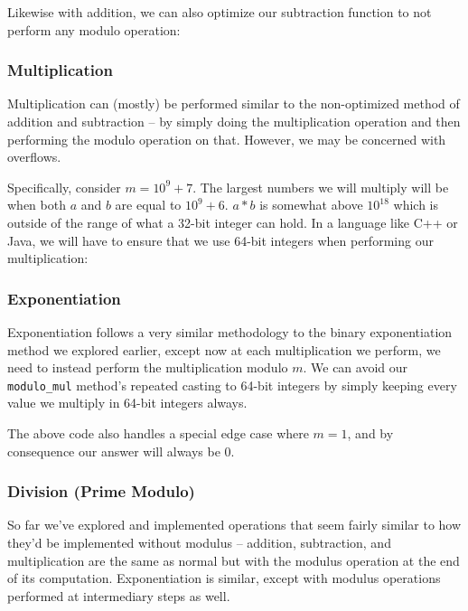 
Likewise with addition, we can also optimize our subtraction function to not perform any modulo operation:


\subsubsection{Multiplication}

Multiplication can (mostly) be performed similar to the non-optimized method of addition and subtraction -- by simply doing the multiplication operation and then performing the modulo operation on that. However, we may be concerned with overflows.

Specifically, consider $m = 10^9 + 7$. The largest numbers we will multiply will be when both $a$ and $b$ are equal to $10^9 + 6$. $a * b$ is somewhat above $10^{18}$ which is outside of the range of what a 32-bit integer can hold. In a language like C++ or Java, we will have to ensure that we use 64-bit integers when performing our multiplication:


\subsubsection{Exponentiation}

Exponentiation follows a very similar methodology to the binary exponentiation method we explored earlier, except now at each multiplication we perform, we need to instead perform the multiplication modulo $m$. We can avoid our \texttt{modulo_mul} method's repeated casting to 64-bit integers by simply keeping every value we multiply in 64-bit integers always.


The above code also handles a special edge case where $m = 1$, and by consequence our answer will always be $0$.

\subsubsection{Division (Prime Modulo)}

So far we've explored and implemented operations that seem fairly similar to how they'd be implemented without modulus -- addition, subtraction, and multiplication are the same as normal but with the modulus operation at the end of its computation. Exponentiation is similar, except with modulus operations performed at intermediary steps as well.

